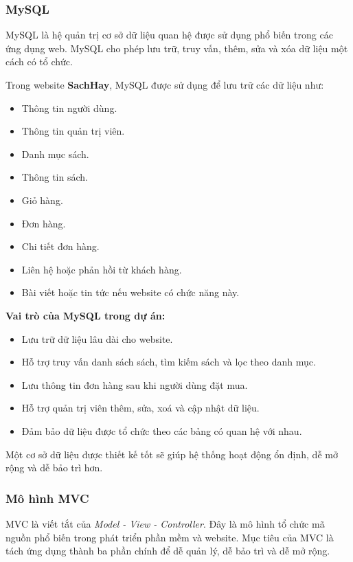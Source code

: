 \subsubsection{MySQL}

MySQL là hệ quản trị cơ sở dữ liệu quan hệ được sử dụng phổ biến trong các ứng dụng web. MySQL cho phép lưu trữ, truy vấn, thêm, sửa và xóa dữ liệu một cách có tổ chức.

Trong website \textbf{SachHay}, MySQL được sử dụng để lưu trữ các dữ liệu như:

\begin{itemize}
	\item Thông tin người dùng.
	\item Thông tin quản trị viên.
	\item Danh mục sách.
	\item Thông tin sách.
	\item Giỏ hàng.
	\item Đơn hàng.
	\item Chi tiết đơn hàng.
	\item Liên hệ hoặc phản hồi từ khách hàng.
	\item Bài viết hoặc tin tức nếu website có chức năng này.
\end{itemize}

\textbf{Vai trò của MySQL trong dự án:}

\begin{itemize}
	\item Lưu trữ dữ liệu lâu dài cho website.
	\item Hỗ trợ truy vấn danh sách sách, tìm kiếm sách và lọc theo danh mục.
	\item Lưu thông tin đơn hàng sau khi người dùng đặt mua.
	\item Hỗ trợ quản trị viên thêm, sửa, xoá và cập nhật dữ liệu.
	\item Đảm bảo dữ liệu được tổ chức theo các bảng có quan hệ với nhau.
\end{itemize}

Một cơ sở dữ liệu được thiết kế tốt sẽ giúp hệ thống hoạt động ổn định, dễ mở rộng và dễ bảo trì hơn.

\subsubsection{Mô hình MVC}

MVC là viết tắt của \textit{Model - View - Controller}. Đây là mô hình tổ chức mã nguồn phổ biến trong phát triển phần mềm và website. Mục tiêu của MVC là tách ứng dụng thành ba phần chính để dễ quản lý, dễ bảo trì và dễ mở rộng.

